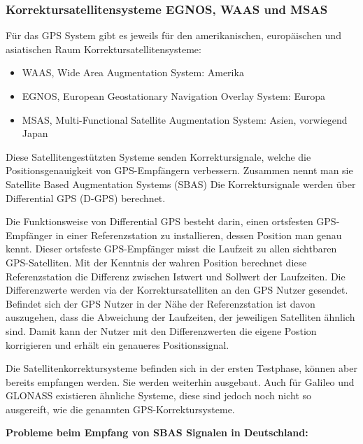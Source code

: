 \documentclass[letterpaper,11pt,ngerman]{andi}
\begin{document}
\subsubsection{Korrektursatellitensysteme EGNOS, WAAS und MSAS}
\label{included_projects/gps/GPS_SPEC/content:korrektursatellitensysteme-egnos-waas-und-msas}
Für das GPS System gibt es jeweils für den amerikanischen, europäischen und asiatischen Raum Korrektursatellitensysteme:
\begin{itemize}
\item {} 
WAAS, Wide Area Augmentation System: Amerika

\item {} 
EGNOS, European Geostationary Navigation Overlay System: Europa

\item {} 
MSAS, Multi-Functional Satellite Augmentation System: Asien, vorwiegend Japan

\end{itemize}

Diese Satellitengestützten Systeme senden Korrektursignale, welche die Positionsgenauigkeit von GPS-Empfängern verbessern. Zusammen nennt man sie Satellite Based Augmentation Systems (SBAS) \cite{env_stud} Die Korrektursignale werden über Differential GPS (D-GPS) berechnet. \cite{sat_nav_schildt}

Die Funktionsweise von Differential GPS besteht darin, einen ortsfesten GPS-Empfänger in einer Referenzstation zu installieren, dessen Position man genau kennt. Dieser ortsfeste GPS-Empfänger misst die Laufzeit zu allen sichtbaren GPS-Satelliten. Mit der Kenntnis der wahren Position berechnet diese Referenzstation die Differenz zwischen Istwert und Sollwert der Laufzeiten. Die Differenzwerte werden via der Korrektursatelliten an den GPS Nutzer gesendet. Befindet sich der GPS Nutzer in der Nähe der Referenzstation ist davon auszugehen, dass die Abweichung der Laufzeiten, der jeweiligen Satelliten ähnlich sind. Damit kann der Nutzer mit den Differenzwerten die eigene Postion korrigieren und erhält ein genaueres Positionssignal. \cite{sat_nav_schildt}

Die Satellitenkorrektursysteme befinden sich in der ersten Testphase, können aber bereits empfangen werden. Sie werden weiterhin ausgebaut. Auch für Galileo und GLONASS existieren ähnliche Systeme, diese sind jedoch noch nicht so ausgereift, wie die genannten GPS-Korrektursysteme. \cite{sat_nav_schildt}

\textbf{Probleme beim Empfang von SBAS Signalen in Deutschland:}
\end{document}
